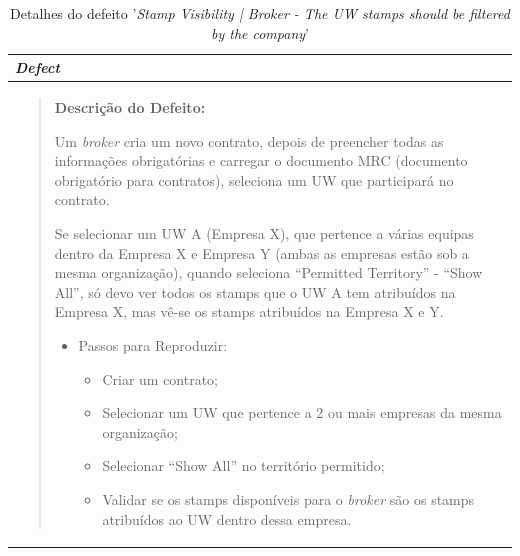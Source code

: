             \begin{table}[htbp] %
                \centering
                \begin{tabularx}{1\textwidth}{|>{\raggedright\arraybackslash}X|}
                    \hline
                    \rowcolor{lightgray}
                    \textbf{\textit{Defect}} \\
                    \hline
                    \rowcolor{lightgray!20}
                  
                    \begin{quote}
                        \textbf{Descrição do Defeito:}
                    
                        Um \textit{broker} cria um novo contrato, depois de preencher todas as informações obrigatórias e carregar o documento MRC (documento obrigatório para contratos), seleciona um UW que participará no contrato.
    
                        Se selecionar um UW A (Empresa X), que pertence a várias equipas dentro da Empresa X e Empresa Y (ambas as empresas estão sob a mesma organização), quando seleciona ``Permitted Territory'' - ``Show All'', só devo ver todos os stamps que o UW A tem atribuídos na Empresa X, mas vê-se os stamps atribuídos na Empresa X e Y.
    
                        \begin{itemize}
                            \item Passos para Reproduzir:
                                \begin{itemize}
                                    \item Criar um contrato;
                                    \item Selecionar um UW que pertence a 2 ou mais empresas da mesma organização;
                                    \item Selecionar ``Show All'' no território permitido;
                                    \item Validar se os stamps disponíveis para o \textit{broker} são os stamps atribuídos ao UW dentro dessa empresa.
                                \end{itemize}
                        \end{itemize}
                    \end{quote}

                    \\
                    \hline
                \end{tabularx}
                \caption{Detalhes do defeito '\textit{Stamp Visibility | Broker - The UW stamps should be filtered by the company}'}\label{table:defect2}
            \end{table}
            

